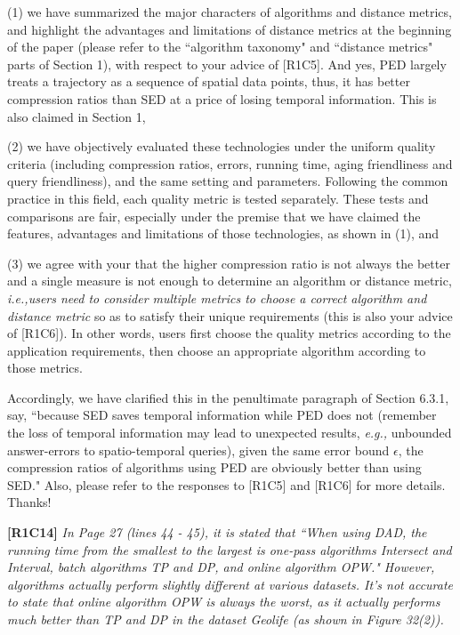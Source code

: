 \documentclass{letter}
\newcommand{\ie}{\emph{i.e.,}\xspace}
\newcommand{\eg}{\emph{e.g.,}\xspace}
\begin{document}
{(1) we have summarized the major characters of algorithms and distance metrics, and highlight the advantages and limitations of distance metrics at the beginning of the paper (please refer to the ``algorithm taxonomy" and ``distance metrics" parts of Section 1), with respect to your advice of [R1C5]. And yes, PED largely treats a trajectory as a sequence of spatial data points, thus, it has better compression ratios than SED at a price of losing temporal information. This is also claimed in Section 1,

(2) we have objectively evaluated these technologies under the uniform quality criteria (including compression ratios, errors, running time, aging friendliness and query friendliness), and the same setting and parameters. Following the common practice in this field, each quality metric is tested separately. These tests and comparisons are fair, especially under the premise that we have claimed the features, advantages and limitations of those technologies, as shown in (1), and

(3) we agree with your that the higher compression ratio is not always the better and a single measure is not enough to determine an algorithm or distance metric, \ie \emph{users need to consider multiple metrics to choose a correct algorithm and distance metric} so as to satisfy their unique requirements (this is also your advice of [R1C6]). In other words, users first choose the quality metrics according to the application requirements, then choose an appropriate algorithm according to those metrics.

Accordingly, we have clarified this in the penultimate paragraph of Section 6.3.1, say, ``{because SED saves temporal information while PED does not (remember the loss of temporal information may lead to unexpected results, \eg unbounded answer-errors to spatio-temporal queries)}, given the same error bound $\epsilon$, the compression ratios of algorithms using PED are obviously better than using SED." Also, please refer to the responses to [R1C5] and [R1C6] for more details. Thanks!

\textbf{[R1C14]} \emph{ In Page 27 (lines 44 - 45), it is stated that ``When using DAD, the running time from the smallest to the largest is one-pass algorithms Intersect and Interval, batch algorithms TP and DP, and online algorithm OPW." However, algorithms actually perform slightly different at various datasets. It's not accurate to state that online algorithm OPW is always the worst, as it actually performs much better than TP and DP in the dataset Geolife (as shown in Figure 32(2)).}

}
\end{document}
